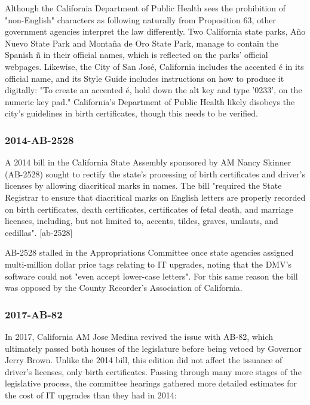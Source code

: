 Although the California Department of Public Health sees the prohibition of
"non-English" characters as following naturally from Proposition 63, other
government agencies interpret the law differently. Two California state parks,
Año Nuevo State Park and Montaña de Oro State Park, manage to contain the
Spanish ñ in their official names, which is reflected on the parks' official
webpages. \parencite{año-nuevo} \parencite{montaña-de-oro} Likewise, the City of
San José, California includes the accented é in its official name, and its Style
Guide includes instructions on how to produce it digitally: "To create an
accented é, hold down the alt key and type '0233'‚ on the numeric key pad."
California's Department of Public Health likely disobeys the city's guidelines
in birth certificates, though this needs to be verified.

\subsubsection{2014-AB-2528}

A 2014 bill in the California State Assembly sponsored by AM Nancy Skinner
(AB-2528) sought to rectify the state's processing of birth certificates and
driver's licenses by allowing diacritical marks in names. The bill "required the
State Registrar to ensure that diacritical marks on English letters are properly
recorded on birth certificates, death certificates, certificates of fetal death,
and marriage licenses, including, but not limited to, accents, tildes, graves,
umlauts, and cedillas". [ab-2528]

AB-2528 stalled in the Appropriations Committee once state agencies assigned
multi-million dollar price tags relating to IT upgrades, noting that the DMV's
software could not "even accept lower-case letters". For this same reason the
bill was opposed by the County Recorder's Association of California.

\subsubsection{2017-AB-82}

In 2017, California AM Jose Medina revived the issue with AB-82, which
ultimately passed both houses of the legislature before being vetoed by Governor
Jerry Brown. Unlike the 2014 bill, this edition did not affect the issuance of
driver's licenses, only birth certificates. Passing through many more stages of
the legislative process, the committee hearings gathered more detailed estimates
for the cost of IT upgrades than they had in 2014:

